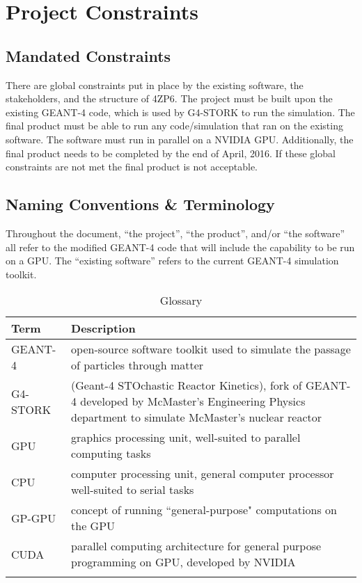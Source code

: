 \documentclass[12pt]{article}
\begin{document}
\section{Project Constraints}

\subsection{Mandated Constraints} %
There are global constraints put in place by the existing software, the stakeholders, and the structure of 4ZP6. The project must be built upon the existing GEANT-4 code, which is used by G4-STORK to run the simulation. The final product must be able to run any code/simulation that ran on the existing software. The software must run in parallel on a NVIDIA GPU. Additionally, the final product needs to be completed by the end of April, 2016. If these global constraints are not met the final product is not acceptable.\\

\subsection{Naming Conventions \& Terminology} %
Throughout the document, ``the project'', ``the product'', and/or ``the software'' all refer to the modified GEANT-4 code that will include the capability to be run on a GPU. The ``existing software'' refers to the current GEANT-4 simulation toolkit.\\

\begin{table}[h]
\centering
\caption{Glossary}
\begin{tabularx}{\textwidth}{l|X}
\Xhline{2\arrayrulewidth}
\bf Term & \bf Description\\
\hline
GEANT-4 & open-source software toolkit used to simulate the passage of particles through matter\\\hline
G4-STORK & (Geant-4 STOchastic Reactor Kinetics), fork of GEANT-4 developed by McMaster's Engineering Physics department to simulate McMaster's nuclear reactor\\\hline
GPU & graphics processing unit, well-suited to parallel computing tasks\\\hline
CPU & computer processing unit, general computer processor well-suited to serial tasks\\\hline
GP-GPU & concept of running ``general-purpose" computations on the GPU\\\hline
CUDA & parallel computing architecture for general purpose programming on GPU, developed by NVIDIA\\
\Xhline{2\arrayrulewidth}
\end{tabularx}
\end{table}
\end{document}
